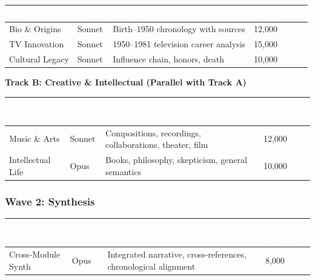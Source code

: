 \documentclass[11pt,letterpaper]{article}
\newcommand{\tableheader}[1]{\textbf{\sffamily\textcolor{white}{#1}}}
\begin{document}
\begin{center}
\begin{tabularx}{\textwidth}{L{3cm}C{1.5cm}XC{2cm}}
\toprule
{}
\tableheader{Task} & \tableheader{Model} & \tableheader{Output} & \tableheader{Est. Tokens} \\
\midrule
Bio \& Origins & Sonnet & Birth--1950 chronology with sources & 12,000 \\
TV Innovation & Sonnet & 1950--1981 television career analysis & 15,000 \\
Cultural Legacy & Sonnet & Influence chain, honors, death & 10,000 \\
\bottomrule
\end{tabularx}
\end{center}

\textbf{Track B: Creative \& Intellectual (Parallel with Track A)}

\begin{center}
\begin{tabularx}{\textwidth}{L{3cm}C{1.5cm}XC{2cm}}
\toprule
{}
\tableheader{Task} & \tableheader{Model} & \tableheader{Output} & \tableheader{Est. Tokens} \\
\midrule
Music \& Arts & Sonnet & Compositions, recordings, collaborations, theater, film & 12,000 \\
Intellectual Life & Opus & Books, philosophy, skepticism, general semantics & 10,000 \\
\bottomrule
\end{tabularx}
\end{center}

\subsubsection{Wave 2: Synthesis}

\begin{center}
\begin{tabularx}{\textwidth}{L{3cm}C{1.5cm}XC{2cm}}
\toprule
{}
\tableheader{Task} & \tableheader{Model} & \tableheader{Output} & \tableheader{Est. Tokens} \\
\midrule
Cross-Module Synth & Opus & Integrated narrative, cross-references, chronological alignment & 8,000 \\
\bottomrule
\end{tabularx}
\end{center}
\end{document}
